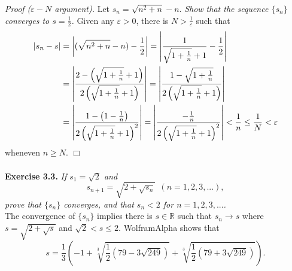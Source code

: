 \documentclass{article}
\begin{document}
\emph{Proof ($\varepsilon-N$ argument).}
Let $s_n = \sqrt{n^2 + n} - n$.
\emph{Show that the sequence $\{s_n\}$ converges to $s = \frac{1}{2}$.}
Given any $\varepsilon > 0$, there is $N > \frac{1}{\varepsilon}$ such that
\begin{align*}
\abs{s_n - s}
&= \abs{(\sqrt{n^2 + n} - n) - \frac{1}{2}}
= \abs{\frac{1}{\sqrt{1+\frac{1}{n}} + 1} - \frac{1}{2}} \\
&= \abs{
\frac{2-\left(\sqrt{1+\frac{1}{n}} + 1\right)}
{2\left(\sqrt{1+\frac{1}{n}} + 1\right)}
}
= \abs{
\frac{1-\sqrt{1+\frac{1}{n}}}
{2\left(\sqrt{1+\frac{1}{n}} + 1\right)}
} \\
&= \abs{
\frac{1 - \left(1- \frac{1}{n}\right)}
{2\left(\sqrt{1+\frac{1}{n}} + 1\right)^2}}
= \abs{
\frac{- \frac{1}{n}}
{2\left(\sqrt{1+\frac{1}{n}} + 1\right)^2}}
< \frac{1}{n}
\leq \frac{1}{N}
< \varepsilon
\end{align*}
wheneven $n \geq N$.
$\Box$ \\\\






\textbf{Exercise 3.3.}
\emph{If $s_1 = \sqrt{2}$ and
$$s_{n+1} = \sqrt{2+\sqrt{s_n}} \:\: (n=1,2,3,...),$$
prove that $\{s_n\}$ converges, and that $s_n < 2$ for $n=1,2,3,...$.} \\

The convergence of $\{s_n\}$
implies there is $s \in \mathbb{R}$ such that $s_n \to s$
where $s = \sqrt{2+\sqrt{s}}$ and $\sqrt{2} < s \leq 2$.
WolframAlpha shows that
$$s = \frac{1}{3}
\left(
-1 + \sqrt[3]{\frac{1}{2}(79 - 3 \sqrt{249})}
   + \sqrt[3]{\frac{1}{2}(79 + 3 \sqrt{249})}
\right).$$ \\
\end{document}
